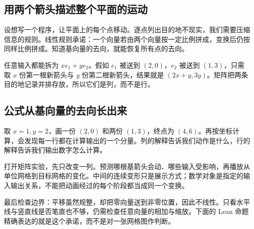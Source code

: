 \subsection*{用两个箭头描述整个平面的运动}
设想写一个程序，让平面上的每个点移动。逐点列出目的地不现实，我们需要压缩信息的规则。线性规则承诺：一个向量若由两个向量按一定比例拼成，变换后仍按同样比例拼成。知道基向量的去向，就能恢复所有点的去向。

任意输入都能拆为 $xe_1+ye_2$。假如 $e_1$ 被送到 $(2,0)$，$e_2$ 被送到 $(1,3)$，只需取 $x$ 份第一根新箭头与 $y$ 份第二根新箭头，结果就是 $(2x+y,3y)$。矩阵把两条目的地记录并排存放，所以它们是列，而不是行。

\subsection*{公式从基向量的去向长出来}
取 $x=1,y=2$，画一份 $(2,0)$ 和两份 $(1,3)$，终点为 $(4,6)$。再按坐标计算，会发现每一行都在计算输出的一个分量。列的解释告诉我们动作是什么，行的解释告诉我们输出数字怎么计算。

打开矩阵实验，先只改变一列。预测哪根基箭头会动、哪些输入受影响，再播放从单位网格到目标网格的变化。中间的连续变形只是展示方式；数学对象是指定的输入输出关系，不能把动画经过的每个阶段都当成同一个变换。

最后检查边界：平移虽然规整，却把零向量送到非零位置，因此不线性。只看水平线与竖直线是否笔直也不够，仍需检查任意向量的相加与缩放。下面的 Lean 命题精确表达的就是这个承诺，而不是对一张网格图作判断。
